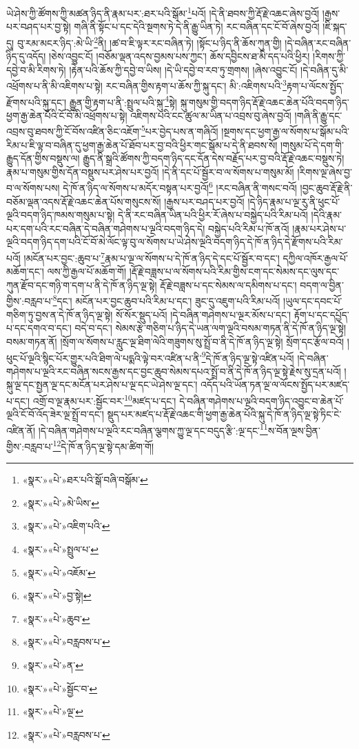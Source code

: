 ཡེ་ཤེས་ཀྱི་ཚོགས་ཀྱི་མཚན་ཉིད་ནི་རྣམ་པར་:ཐར་པའི་སྒོམ་\footnote{«སྣར་»«པེ་»ཐར་པའི་སྒོ་བཞི་བསྒོམ་}པའོ། །དེ་ནི་ཐབས་ཀྱི་རྡོ་རྗེ་འཆང་ཞེས་བྱའོ། །རྒྱས་པར་བཤད་པར་བྱ་སྟེ། གཞི་ནི་སྟོང་པ་དང་དེའི་སྔགས་ཏེ་དེ་ནི་རྒྱུ་ཡིན་ཏེ། རང་བཞིན་དང་ངོ་བོ་ཞེས་བྱའོ། །ཇི་སྐད་དུ། བུ་རམ་མངར་ཉིད་:མེ་ཡི་\footnote{«སྣར་»«པེ་»མེ་ཡིས་}ནི། །ཚ་བ་ཇི་ལྟར་རང་བཞིན་ཏེ། །སྟོང་པ་ཉིད་ནི་ཆོས་ཀུན་གྱི། །དེ་བཞིན་རང་བཞིན་ཉིད་དུ་འདོད། །ཅེས་འབྱུང་ངོ། །བཅོམ་ལྡན་འདས་བྱམས་པས་ཀྱང་། ཆོས་དབྱིངས་ཐ་མི་དད་པའི་ཕྱིར། །རིགས་ཀྱི་དབྱེ་བ་མི་རིགས་ཏེ། །རྟེན་པའི་ཆོས་ཀྱི་དབྱེ་བ་ཡིས། །དེ་ཡི་དབྱེ་བ་རབ་ཏུ་གྲགས། །ཞེས་འབྱུང་ངོ། །དེ་བཞིན་དུ་མི་འཕྲོགས་པ་ནི་མི་འཇིགས་པ་སྟེ། རང་བཞིན་གྱིས་རྟག་པ་ཆོས་ཀྱི་སྐུ་དང་། མི་:འཇིགས་པའི་\footnote{«སྣར་»«པེ་»འཇིག་པའི་}རྟག་པ་ལོངས་སྤྱོད་རྫོགས་པའི་སྐུ་དང་། རྒྱུན་གྱི་རྟག་པ་ནི་:སྤྲུལ་པའི་སྐུ་\footnote{«སྣར་»«པེ་»སྤྲུལ་པ་}སྟེ། སྐུ་གསུམ་གྱི་བདག་ཉིད་རྡོ་རྗེ་འཆང་ཆེན་པོའི་བདག་ཉིད་ཕྱག་རྒྱ་ཆེན་པོའི་ངོ་བོ་མི་འཕྲོགས་པ་སྟེ། འཇིགས་པའི་ངང་ཚུལ་མ་ཡིན་པ་འབྲས་བུ་ཞེས་བྱའོ། །གཞི་ནི་རྒྱུ་དང་འབྲས་བུ་ཐབས་ཀྱི་ངོ་བོས་འཛིན་ཅིང་འཇོག་\footnote{«སྣར་»«པེ་»འཇོམ་}པར་བྱེད་པས་ན་གཞིའོ། །སྔགས་དང་ཕྱག་རྒྱ་ལ་སོགས་པ་སྒོམ་པའི་རིམ་པ་ཇི་ལྟ་བ་བཞིན་དུ་ཕྱག་རྒྱ་ཆེན་པོ་ཐོབ་པར་བྱ་བའི་ཕྱིར་གང་སྒོམ་པ་དེ་ནི་ཐབས་སོ། །གསུམ་པོ་དེ་དག་གི་རྒྱུད་དོན་གྱིས་བསྡུས་ལ། རྒྱུད་ནི་སྒྲའི་ཚོགས་ཀྱི་བདག་ཉིད་དང་དོན་དེས་བརྗོད་པར་བྱ་བའི་རྡོ་རྗེ་འཆང་བསྡུས་ཏེ། རྣམ་པ་གསུམ་གྱིས་དོན་བསྡུས་པར་ཤེས་པར་བྱའོ། །དེ་ནི་དང་པོ་སྦྱོར་བ་ལ་སོགས་པ་གསུམ་མོ། །རིགས་ལྔ་ཞེས་བྱ་བ་ལ་སོགས་པས། དེ་ཁོ་ན་ཉིད་ལ་སོགས་པ་མདོར་བསྟན་པར་བྱའོ།\footnote{«སྣར་»«པེ་»བྱ་སྟེ།} །རང་བཞིན་ནི་གསང་བའོ། །བྱང་ཆུབ་རྡོ་རྗེ་ནི་བཅོམ་ལྡན་འདས་རྡོ་རྗེ་འཆང་ཆེན་པོས་གསུངས་སོ། །རྒྱས་པར་བཤད་པར་བྱའོ། །དེ་ཉིད་རྣམ་པ་ལྔ་རུ་ནི་ཕུང་པོ་ལྔའི་བདག་ཉིད་ཁམས་གསུམ་པ་སྟེ། དེ་ནི་རང་བཞིན་ཡིན་པའི་ཕྱིར་རོ་ཞེས་པ་བསྐྱེད་པའི་རིམ་པའོ། །དེའི་རྣམ་པར་དག་པའི་རང་བཞིན་དེ་བཞིན་གཤེགས་པ་ལྔའི་བདག་ཉིད་དེ། བསྐྱེད་པའི་རིམ་པ་ཁོ་ནའོ། །རྣམ་པར་ཤེས་པ་ལྔའི་བདག་ཉིད་དག་པའི་ངོ་བོ་མེ་ལོང་ལྟ་བུ་ལ་སོགས་པ་ཡེ་ཤེས་ལྔའི་བདག་ཉིད་དེ་ཁོ་ན་ཉིད་དེ་རྫོགས་པའི་རིམ་པའོ། །མངོན་པར་བྱང་:ཆུབ་པ་\footnote{«སྣར་»«པེ་»ཆུབ་}རྣམ་པ་ལྔ་ལ་སོགས་པ་དེ་ཁོ་ན་ཉིད་དེ་དང་པོ་སྦྱོར་བ་དང་། དཀྱིལ་འཁོར་རྒྱལ་པོ་མཆོག་དང་། ལས་ཀྱི་རྒྱལ་པོ་མཆོག་གོ། །རྡོ་རྗེ་བཟླས་པ་ལ་སོགས་པའི་རིམ་གྱིས་ངག་དང་སེམས་དང་ལུས་དང་ཀུན་རྫོབ་དང་གཉི་ག་དག་པ་ནི་དེ་ཁོ་ན་ཉིད་ལྔ་སྟེ། རྡོ་རྗེ་བཟླས་པ་དང་སེམས་ལ་དམིགས་པ་དང་། བདག་ལ་བྱིན་གྱིས་:བརླབ་པ་\footnote{«སྣར་»«པེ་»བརླབས་པ་}དང་། མངོན་པར་བྱང་ཆུབ་པའི་རིམ་པ་དང་། ཟུང་དུ་འཇུག་པའི་རིམ་པའོ། །ཡུལ་དང་དབང་པོ་གཅིག་ཏུ་བྱས་ན་དེ་ཁོ་ན་ཉིད་ལྔ་སྟེ། སོ་སོར་སྡུད་པའོ། །དེ་བཞིན་གཤེགས་པ་ལྔར་མོས་པ་དང་། རྟོག་པ་དང་དཔྱོད་པ་དང་དགའ་བ་དང་། བདེ་བ་དང་། སེམས་རྩེ་གཅིག་པ་ཉིད་དེ་ཡན་ལག་ལྔའི་བསམ་གཏན་ནི་དེ་ཁོ་ན་ཉིད་ལྔ་སྟེ། བསམ་གཏན་ནོ། །སྲོག་ལ་སོགས་པ་རླུང་ལྔ་ཐིག་ལེའི་གཟུགས་སུ་སྤྲོ་བ་ནི་དེ་ཁོ་ན་ཉིད་ལྔ་སྟེ། སྲོག་དང་རྩོལ་བའོ། །ཕུང་པོ་ལྔའི་སྙིང་པོར་གྱུར་པའི་ཐིག་ལེ་པདྨའི་ལྟེ་བར་འཛིན་པ་ནི་\footnote{«སྣར་»«པེ་»ན་}དེ་ཁོ་ན་ཉིད་ལྔ་སྟེ་འཛིན་པའོ། །དེ་བཞིན་གཤེགས་པ་ལྔའི་རང་བཞིན་སངས་རྒྱས་དང་བྱང་ཆུབ་སེམས་དཔའ་སྤྲོ་བ་ནི་དེ་ཁོ་ན་ཉིད་ལྔ་སྟེ་རྗེས་སུ་དྲན་པའོ། །སྐུ་ལྔ་དང་སྤྱན་ལྔ་དང་མངོན་པར་ཤེས་པ་ལྔ་དང་ཡེ་ཤེས་ལྔ་དང་། འདོད་པའི་ཡོན་ཏན་ལྔ་ལ་ལོངས་སྤྱོད་པར་མཛད་པ་དང་། འགྲོ་བ་ལྔ་རྣམ་པར་:སྦྱོང་བར་\footnote{«སྣར་»«པེ་»སྦྱོང་བ་}མཛད་པ་དང་། དེ་བཞིན་གཤེགས་པ་ལྔའི་བདག་ཉིད་འབྱུང་བ་ཆེན་པོ་ལྔའི་ངོ་བོ་འོད་ཟེར་ལྔ་སྤྲོ་བ་དང་། སྡུད་པར་མཛད་པ་རྡོ་རྗེ་འཆང་གི་ཕྱག་རྒྱ་ཆེན་པོའི་སྐུ་དེ་ཁོ་ན་ཉིད་ལྔ་སྟེ་ཏིང་ངེ་འཛིན་ནོ། །དེ་བཞིན་གཤེགས་པ་ལྔའི་རང་བཞིན་ལྕགས་ཀྱུ་ལྔ་དང་བདུད་རྩི་:ལྔ་དང་\footnote{«སྣར་»«པེ་»ལྔ་}ས་བོན་ལྔས་བྱིན་གྱིས་:བརླབ་པ་\footnote{«སྣར་»«པེ་»བརླབས་པ་}དེ་ཁོ་ན་ཉིད་ལྔ་སྟེ་དམ་ཚིག་གོ། 